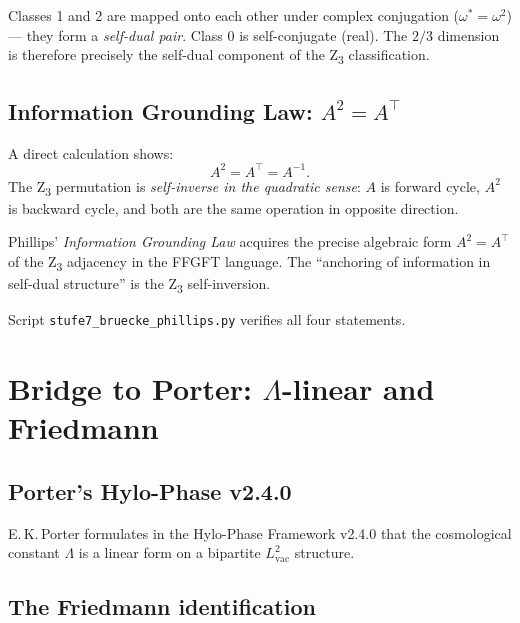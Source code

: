Classes 1 and 2 are mapped onto each other under complex conjugation (\(\omega^* = \omega^2\)) --- they form a \emph{self-dual pair}. Class 0 is self-conjugate (real). The \(2/3\) dimension is therefore precisely the self-dual component of the Z\textsubscript{3} classification.

\subsection[Information Grounding Law: $A^2 = A^T$]{Information Grounding Law: \texorpdfstring{\(A^2 = A^\top\)}{A2 = AT}}

A direct calculation shows:
\begin{equation}
A^2 = A^\top = A^{-1}.
\label{eq:igl}
\end{equation}
The Z\textsubscript{3} permutation is \emph{self-inverse in the quadratic sense}: \(A\) is forward cycle, \(A^2\) is backward cycle, and both are the same operation in opposite direction.

\begin{interpretation}
Phillips' \emph{Information Grounding Law} acquires the precise algebraic form \(A^2 = A^\top\) of the Z\textsubscript{3} adjacency in the FFGFT language. The ``anchoring of information in self-dual structure'' is the Z\textsubscript{3} self-inversion.
\end{interpretation}

Script \texttt{stufe7\_bruecke\_phillips.py} verifies all four statements.

\section[Bridge to Porter: Lambda-linear and Friedmann]{Bridge to Porter: \texorpdfstring{\(\Lambda\)-linear}{Lambda-linear} and Friedmann}
\label{sec:porter}

\subsection{Porter's Hylo-Phase v2.4.0}

E.\,K.\,Porter formulates in the Hylo-Phase Framework v2.4.0 that the cosmological constant \(\Lambda\) is a linear form on a bipartite \(L_\text{vac}^2\) structure.

\subsection{The Friedmann identification}

